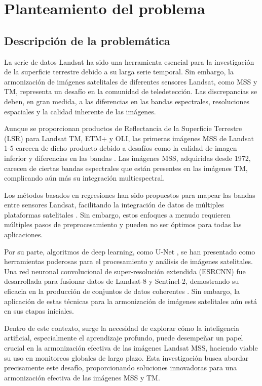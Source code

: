     \section{Planteamiento del problema}
        \subsection{Descripción de la problemática}
            La serie de datos Landsat ha sido una herramienta esencial para la investigación de la superficie terrestre debido a su larga serie temporal. Sin embargo, la armonización de imágenes satelitales de diferentes sensores Landsat, como MSS y TM, representa un desafío en la comunidad de teledetección. Las discrepancias se deben, en gran medida, a las diferencias en las bandas espectrales, resoluciones espaciales y la calidad inherente de las imágenes.
            
            Aunque se proporcionan productos de Reflectancia de la Superficie Terrestre (LSR) para Landsat TM, ETM+ y OLI, las primeras imágenes MSS de Landsat 1-5 carecen de dicho producto debido a desafíos como la calidad de imagen inferior y diferencias en las bandas \citep{zhao2022framework}. Las imágenes MSS, adquiridas desde 1972, carecen de ciertas bandas espectrales que están presentes en las imágenes TM, complicando aún más su integración multiespectral.
            
            Los métodos basados en regresiones han sido propuestos para mapear las bandas entre sensores Landsat, facilitando la integración de datos de múltiples plataformas satelitales \citep{roy2016characterization}. Sin embargo, estos enfoques a menudo requieren múltiples pasos de preprocesamiento y pueden no ser óptimos para todas las aplicaciones.
            
            Por su parte, algoritmos de deep learning, como U-Net \citep{ronneberger2015u}, se han presentado como herramientas poderosas para el procesamiento y análisis de imágenes satelitales. Una red neuronal convolucional de super-resolución extendida (ESRCNN) fue desarrollada para fusionar datos de Landsat-8 y Sentinel-2, demostrando su eficacia en la producción de conjuntos de datos coherentes \citep{shao2019deep}. Sin embargo, la aplicación de estas técnicas para la armonización de imágenes satelitales aún está en sus etapas iniciales.
    
            Dentro de este contexto, surge la necesidad de explorar cómo la inteligencia artificial, especialmente el aprendizaje profundo, puede desempeñar un papel crucial en la armonización efectiva de las imágenes Landsat MSS, haciendo viable su uso en monitoreos globales de largo plazo. Esta investigación busca abordar precisamente este desafío, proporcionando soluciones innovadoras para una armonización efectiva de las imágenes MSS y TM.
            
